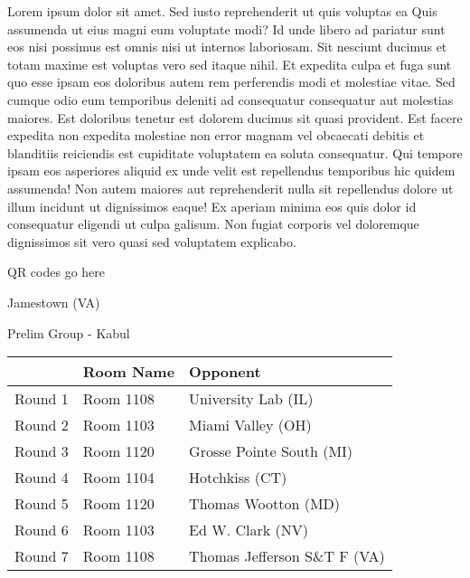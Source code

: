 \documentclass{article}%
\begin{document}
\vspace*{8pt}%
\linebreak%
\newline%
\newline%
Lorem ipsum dolor sit amet. Sed iusto reprehenderit ut quis voluptas ea Quis assumenda ut eius magni eum voluptate modi? Id unde libero ad pariatur sunt eos nisi possimus est omnis nisi ut internos laboriosam. Sit nesciunt ducimus et totam maxime est voluptas vero sed itaque nihil. Et expedita culpa et fuga sunt quo esse ipsam eos doloribus autem rem perferendis modi et molestiae vitae.\newline%
\newline%
Sed cumque odio eum temporibus deleniti ad consequatur consequatur aut molestias maiores. Est doloribus tenetur est dolorem ducimus sit quasi provident. Est facere expedita non expedita molestiae non error magnam vel obcaecati debitis et blanditiis reiciendis est cupiditate voluptatem ea soluta consequatur. Qui tempore ipsam eos asperiores aliquid ex unde velit est repellendus temporibus hic quidem assumenda!\newline%
\newline%
Non autem maiores aut reprehenderit nulla sit repellendus dolore ut illum incidunt ut dignissimos eaque! Ex aperiam minima eos quis dolor id consequatur eligendi ut culpa galisum. Non fugiat corporis vel doloremque dignissimos sit vero quasi sed voluptatem explicabo.\newline%
\newline%
%
\vspace*{30pt}%
\begin{center}%
\begin{Huge}%
QR codes go here%
\end{Huge}%
\end{center}%
\newpage%
%
\begin{center}%
\begin{Huge}%
Jamestown (VA)%
\end{Huge}%
\vspace*{8pt}%
\linebreak%
\begin{Large}%
Prelim Group {-} Kabul%
\end{Large}%
\end{center}%
\begin{tabularx}{\textwidth}{|c|Y|Y|}%
\hline%
&Room Name&Opponent\\%
\hline%
Round 1&Room 1108&University Lab (IL)\\%
Round 2&Room 1103&Miami Valley (OH)\\%
Round 3&Room 1120&Grosse Pointe South (MI)\\%
Round 4&Room 1104&Hotchkiss (CT)\\%
Round 5&Room 1120&Thomas Wootton (MD)\\%
Round 6&Room 1103&Ed W. Clark (NV)\\%
Round 7&Room 1108&Thomas Jefferson S\&T F (VA)\\%
\hline%
\end{tabularx}%
\end{document}

